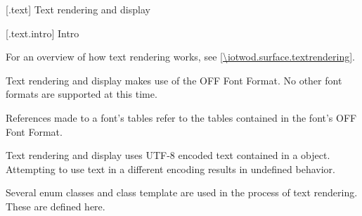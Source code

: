 
 [\iotwod.text] {Text rendering and display}

 [\iotwod.text.intro] {Intro}

\pnum
For an overview of how text rendering works, see \ref{\iotwod.surface.textrendering}.

\pnum
Text rendering and display makes use of the OFF Font Format. No other font formats are supported at this time.

\pnum
References made to a font's tables refer to the tables contained in the font's OFF Font Format.

\pnum
Text rendering and display uses UTF-8 encoded text contained in a  object. Attempting to use text in a different encoding results in undefined behavior.

\pnum
Several enum classes and class template are used in the process of text rendering. These are defined here.

\addtocounter{SectionDepthBase}{1}



%








\addtocounter{SectionDepthBase}{-1}
